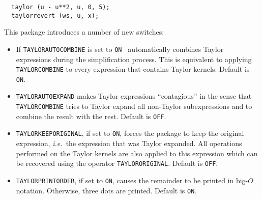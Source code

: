 \begin{verbatim}
  taylor (u - u**2, u, 0, 5);
  taylorrevert (ws, u, x);
\end{verbatim}

This package introduces a number of new switches:
\begin{itemize}

\item If \verb|TAYLORAUTOCOMBINE| is set to \verb|ON| \REDUCE\
    automatically combines Taylor expressions during the simplification
    process.  This is equivalent to applying \verb|TAYLORCOMBINE| to
    every expression that contains Taylor kernels.
    Default is \verb|ON|.

\item \verb|TAYLORAUTOEXPAND| makes Taylor expressions ``contagious''
    in the sense that \verb|TAYLORCOMBINE| tries to Taylor expand
    all non-Taylor subexpressions and to combine the result with the
    rest. Default is \verb|OFF|.

\item \verb|TAYLORKEEPORIGINAL|, if set to \verb|ON|, forces the
    package to keep the original expression, {\em i.e.\ }the expression
    that was Taylor expanded.  All operations performed on the
    Taylor kernels are also applied to this expression  which can
    be recovered using the operator \verb|TAYLORORIGINAL|.
    Default is \verb|OFF|.

\item \verb|TAYLORPRINTORDER|, if set to \verb|ON|, causes the
    remainder to be printed in big-$O$ notation.  Otherwise, three
    dots are printed. Default is \verb|ON|.

\end{itemize}

